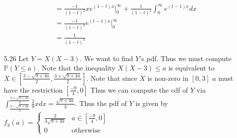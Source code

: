 \documentclass[12pt, letterpaper]{article}
\newcommand{\Pro}{\mathbb{P}}
\begin{document}
\begin{enumerate}
\begin{align*}
		&= \frac{-1}{(1-t)^2} xe^{(1-t)x} \bigg\rvert_{0}^\infty + \frac{1}{(1-t)^2}\int_0^\infty e^{(t-1)x}dx\\
		&= \frac{-1}{(1-t)^3} e^{(t-1)x} \bigg\rvert_0^\infty\\
		&= \frac{1}{(1-t)^3}
	\end{align*}
	\item[5.26] Let $Y=X(X-3)$.  We want to find $Y$'s pdf.  Thus we must compute $\Pro(Y \leq a)$.  Note that the inequality $X(X-3) \leq a$ 
	is equivalent to $X \in [\frac{3-\sqrt{9+4a}}{2},\frac{3+\sqrt{9+4a}}{2}]$.  Note that since $X$ is non-zero in $[0,3]$ $a$ must have the 
	restriction $[\frac{-9}{4},0]$
	Thus we can compute the cdf of $Y$ via $\int_{\frac{3-\sqrt{9+4a}}{2}}^{\frac{3+\sqrt{9+4a}}{2}} \frac{2}{9}xdx = \frac{\sqrt{9+4a}}{3}$.
	Thus the pdf of $Y$ is given by $f_y(a) = \begin{cases} \frac{2}{3\sqrt{9+4a}} & a \in [\frac{-9}{4},0]\\ 0 & \text{otherwise} \end{cases}$
\end{enumerate}
\end{document}
